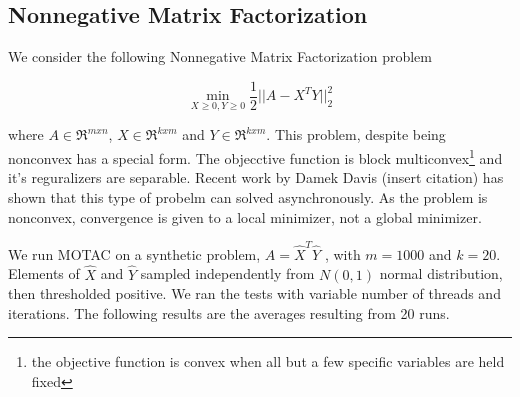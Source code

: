 \subsection{Nonnegative Matrix Factorization}

We consider the following Nonnegative Matrix Factorization problem

\begin{equation*}
	\min_{X \geq 0,Y \geq 0} \frac{1}{2}||A-X^T Y||_2^2
\end{equation*}

where $A \in \Re^{mxn}$, $X \in \Re^{kxm}$ and $Y \in \Re^{kxm}$.
This problem, despite being nonconvex has a special form.
The objecctive function  is block multiconvex\footnote{the objective function is convex when all but a few specific variables are held fixed} and it's reguralizers are separable.
Recent work by Damek Davis (insert citation) has shown that this type of probelm can solved asynchronously.
As the problem is nonconvex, convergence is given to a local minimizer, not a global minimizer.

We run MOTAC on a synthetic problem, $A=\hat X^T \hat Y$ ,  with $m=1000$ and $k=20$.
Elements of $\hat X$ and $\hat Y$ sampled independently from $N(0, 1)$ normal distribution, then thresholded positive.
We ran the tests with variable number of threads and iterations. 
The following results are the averages resulting from 20 runs.


